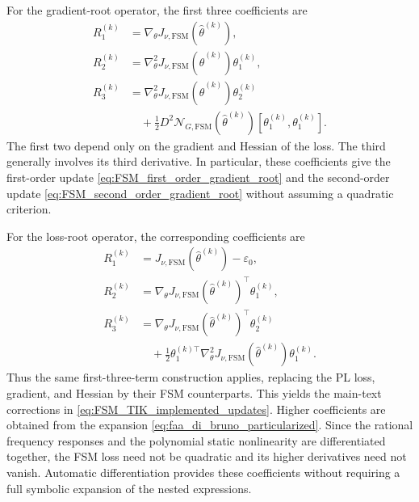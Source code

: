 \documentclass[11pt]{article}
\theoremstyle{remark}
\begin{document}
For the gradient-root operator, the first three coefficients are
\begin{equation}
\begin{aligned}
    R_1^{(k)}&=\nabla_\theta J_{\nu,\mathrm{FSM}}(\hat\theta^{(k)}),\\
    R_2^{(k)}&=\nabla_\theta^2J_{\nu,\mathrm{FSM}}(\hat\theta^{(k)})
                   \theta_1^{(k)},\\
    R_3^{(k)}&=\nabla_\theta^2J_{\nu,\mathrm{FSM}}(\hat\theta^{(k)})
                   \theta_2^{(k)}\\
       &\quad+\frac12D^2\mathcal N_{G,\mathrm{FSM}}(\hat\theta^{(k)})
                        [\theta_1^{(k)},\theta_1^{(k)}].
\end{aligned}
\end{equation}
The first two depend only on the gradient and Hessian of the loss.
The third generally involves its third derivative. In particular,
these coefficients give the first-order update
\eqref{eq:FSM_first_order_gradient_root} and the second-order update
\eqref{eq:FSM_second_order_gradient_root} without assuming a
quadratic criterion.

For the loss-root operator, the corresponding coefficients are
\begin{equation}
\begin{aligned}
    R_1^{(k)}&=J_{\nu,\mathrm{FSM}}(\hat\theta^{(k)})-\varepsilon_0,\\
    R_2^{(k)}&=\nabla_\theta J_{\nu,\mathrm{FSM}}(\hat\theta^{(k)})^\top
                   \theta_1^{(k)},\\
    R_3^{(k)}&=\nabla_\theta J_{\nu,\mathrm{FSM}}(\hat\theta^{(k)})^\top
                   \theta_2^{(k)}\\
       &\quad+\frac12\theta_1^{(k)\top}
               \nabla_\theta^2J_{\nu,\mathrm{FSM}}(\hat\theta^{(k)})
               \theta_1^{(k)}.
\end{aligned}
\end{equation}
Thus the same first-three-term construction applies, replacing the
PL loss, gradient, and Hessian by their FSM counterparts.
This yields the main-text corrections in
\eqref{eq:FSM_TIK_implemented_updates}. Higher coefficients are obtained from the expansion
\eqref{eq:faa_di_bruno_particularized}. Since the rational
frequency responses and the polynomial static nonlinearity are
differentiated together, the FSM loss need not be quadratic and
its higher derivatives need not vanish. Automatic differentiation
provides these coefficients without requiring a full symbolic
expansion of the nested expressions.
\end{document}
